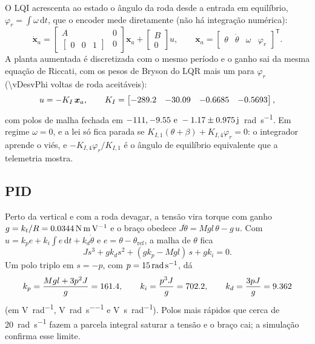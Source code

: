 \documentclass[11pt,a4paper]{article}
\newcommand{\dd}{\mathrm{d}}
\newcommand{\vt}[1]{\bm{#1}}
\begin{document}
O LQI acrescenta ao estado o ângulo da roda desde a entrada em equilíbrio,
$\varphi_r = \int \omega\,\dd t$, que o encoder mede diretamente (não há integração numérica):
\begin{equation}
  \dot{\vt{x}}_a = \begin{bmatrix} A & 0 \\ \begin{bmatrix} 0 & 0 & 1 \end{bmatrix} & 0 \end{bmatrix} \vt{x}_a
  + \begin{bmatrix} B \\ 0 \end{bmatrix} u,
  \qquad \vt{x}_a = \begin{bmatrix} \theta & \dot\theta & \omega & \varphi_r \end{bmatrix}^{\mathsf T}.
\end{equation}
A planta aumentada é discretizada com o mesmo período e o ganho sai da mesma equação de Riccati,
com os pesos de Bryson do LQR mais um para $\varphi_r$ (\num{\vDesvPhi} voltas de roda
aceitáveis):
\begin{equation}
  u = -K_I\,\vt{x}_a, \qquad K_I = \matKI ,
\end{equation}
com polos de malha fechada em $\num{-111}, \num{-9.55} \text{ e } \num{-1.17} \pm \num{0.975}\,\mathrm{j}$~\unit{\radian\per\second}. Em regime $\omega = 0$, e a
lei só fica parada se $K_{I,1}(\theta + \beta) + K_{I,4}\varphi_r = 0$: o integrador aprende o
viés, e $-K_{I,4}\varphi_r / K_{I,1}$ é o ângulo de equilíbrio equivalente que a telemetria mostra.

\subsection{PID}

Perto da vertical e com a roda devagar, a tensão vira torque com ganho
$g = k_t/R = \qty{0.0344}{\newton\metre\per\volt}$ e o braço obedece
$J\ddot\theta = Mgl\,\theta - g\,u$. Com $u = k_p e + k_i \int e\,\dd t + k_d\dot\theta$ e
$e = \theta - \theta_{\text{ref}}$, a malha de $\theta$ fica
\begin{equation}
  J s^3 + g k_d s^2 + (g k_p - Mgl)\, s + g k_i = 0 .
\end{equation}
Um polo triplo em $s = -p$, com $p = \qty{15}{\radian\per\second}$, dá
\begin{equation}
  k_p = \frac{Mgl + 3p^2 J}{g} = \num{161.4}, \qquad
  k_i = \frac{p^3 J}{g} = \num{702.2}, \qquad
  k_d = \frac{3 p J}{g} = \num{9.362}
\end{equation}
(em \unit{\volt\per\radian}, \unit{\volt\per\radian\per\second} e
\unit{\volt\second\per\radian}). Polos mais rápidos que cerca de \qty{20}{\radian\per\second}
fazem a parcela integral saturar a tensão e o braço cai; a simulação confirma esse limite.
\end{document}
